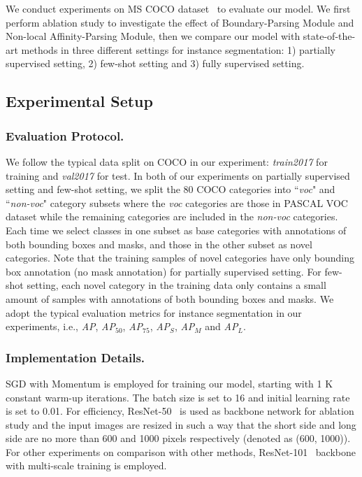 \documentclass[runningheads]{llncs}
\begin{document}
We conduct experiments on MS COCO dataset~\cite{lin2014microsoft} to evaluate our model. We first perform ablation study to investigate the effect of Boundary-Parsing Module and Non-local Affinity-Parsing Module, then we compare our model with state-of-the-art methods in three different settings for instance segmentation: 1) partially supervised setting, 2) few-shot setting and 3) fully supervised setting. 

\vspace{-0.15in}

\subsection{Experimental Setup}
\vspace{-0.05in}
\subsubsection{Evaluation Protocol.}
We follow the typical data split on COCO in our experiment: \emph{train2017} for training and \emph{val2017} for test. In both of our experiments on partially supervised setting and few-shot setting, we split the 80 COCO categories into ``\emph{voc}" and ``\emph{non-voc}" category subsets where the \emph{voc} categories are those in PASCAL VOC~\cite{everingham2010pascal} dataset while the remaining categories are included in the \emph{non-voc} categories. Each time we select classes in one subset as base categories with annotations of both bounding boxes and masks, and those in the other subset as novel categories. Note that the training samples of novel categories have only bounding box annotation (no mask annotation) for partially supervised setting. For few-shot setting, each novel category in the training data only contains a small amount of samples with annotations of both bounding boxes and masks. We adopt the typical evaluation metrics for instance segmentation in our experiments, i.e., \emph{AP}, \emph{AP$_{50}$}, \emph{AP$_{75}$}, \emph{AP$_{S}$}, \emph{AP$_{M}$} and \emph{AP$_{L}$}.

\vspace{-0.2in}

\subsubsection{Implementation Details.}
SGD with Momentum is employed for training our model, starting with 1 K constant warm-up iterations. The batch size is set to 16 and initial learning rate is set to 0.01.  For efficiency, ResNet-50~\cite{he2016deep} is used as backbone network for ablation study and the input images are resized in such a way that the short side and long side are no more than 600 and 1000 pixels respectively (denoted as (600, 1000)). For other experiments on comparison with other methods, ResNet-101~\cite{he2016deep} backbone with multi-scale training is employed. 
\end{document}
